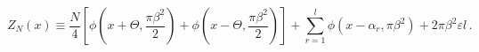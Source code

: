 \begin{equation}
Z_N(x)\equiv \frac {N}{4}\left [\phi \left (x +\Theta, \frac {\pi \beta ^2}{2} \right )+\phi \left(x -\Theta, \frac {\pi \beta ^2}{2}\right) \right]
+\sum _{r=1}^{l}\phi (x -\alpha _r, \pi \beta ^2)+2\pi \beta ^2 \varepsilon l  \, . \label{count0}
\end{equation}

